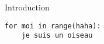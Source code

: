 \lstlistoflistings
\begin{section}{Introduction}
	\begin{lstlisting}[caption=ceci est un test, captionpos=b]
for moi in range(haha):
	je suis un oiseau
\end{lstlisting}
\end{section}
